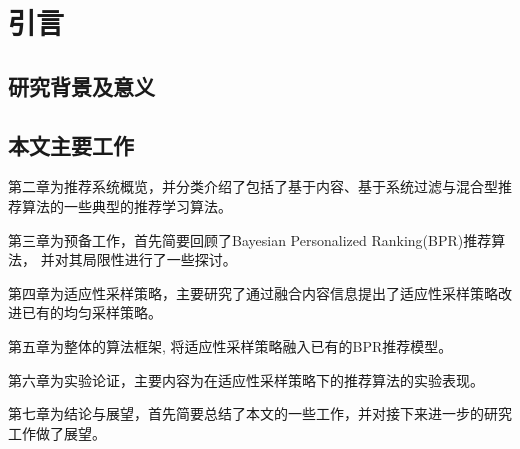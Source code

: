 \section{引言}

\subsection{研究背景及意义}

\zhlipsum*[1-5]



\subsection{本文主要工作}

\zhlipsum[6-10,18][name=trad]



 
 第二章为推荐系统概览，并分类介绍了包括了基于内容、基于系统过滤与混合型推荐算法的一些典型的推荐学习算法。
 
 第三章为预备工作，首先简要回顾了Bayesian Personalized Ranking(BPR)推荐算法， 并对其局限性进行了一些探讨。
 
 第四章为适应性采样策略，主要研究了通过融合内容信息提出了适应性采样策略改进已有的均匀采样策略。
 
 第五章为整体的算法框架, 将适应性采样策略融入已有的BPR推荐模型。
 
 第六章为实验论证，主要内容为在适应性采样策略下的推荐算法的实验表现。
 
 第七章为结论与展望，首先简要总结了本文的一些工作，并对接下来进一步的研究工作做了展望。
